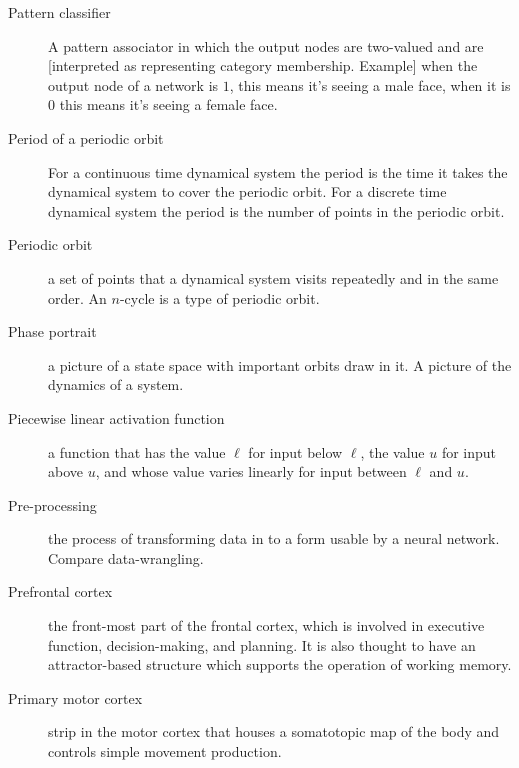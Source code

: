 \begin{description}

\item[Pattern classifier] A pattern associator in which the output nodes are two-valued and are [interpreted as representing category membership. Example] when the output node of a network is $1$, this means it's seeing a male face, when it is $0$ this means it's seeing a female face.


\item[Period of a periodic orbit] For a continuous time dynamical system the period is the time it takes the dynamical system to cover the periodic orbit. For a discrete time dynamical system the period is the number of points in the periodic orbit.

\item[Periodic orbit] a set of points that a dynamical system visits repeatedly and in the same order. An $n$-cycle is a type of periodic orbit.

\item[Phase portrait] a picture of a state space with important orbits draw in it. A picture of the dynamics of a system.

\item[Piecewise linear activation function] a function that has the value $\ell$ for input below $\ell$, the value $u$ for input above $u$, and whose  value varies linearly for input between $\ell$ and $u$. 

\item[Pre-processing] the process of transforming data in to a form usable by a neural network. Compare data-wrangling.


\item[Prefrontal cortex] the front-most part of the frontal cortex, which is involved in executive function, decision-making, and planning. It is also thought to have an attractor-based structure which supports the operation of working memory.

\item[Primary motor cortex] strip in the motor cortex that houses a somatotopic map of the body and controls simple movement production. 


\end{description}
